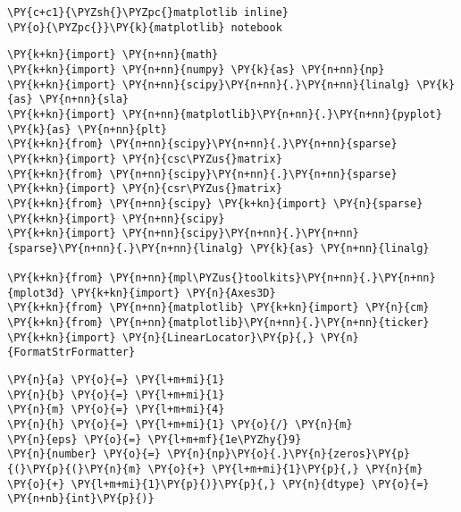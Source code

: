 
    \begin{tcolorbox}[breakable, size=fbox, boxrule=1pt, pad at break*=1mm,colback=cellbackground, colframe=cellborder]
\begin{Verbatim}[commandchars=\\\{\}]
\PY{c+c1}{\PYZsh{}\PYZpc{}matplotlib inline}
\PY{o}{\PYZpc{}}\PY{k}{matplotlib} notebook
\end{Verbatim}
\end{tcolorbox}

    \begin{tcolorbox}[breakable, size=fbox, boxrule=1pt, pad at break*=1mm,colback=cellbackground, colframe=cellborder]
\begin{Verbatim}[commandchars=\\\{\}]
\PY{k+kn}{import} \PY{n+nn}{math}
\PY{k+kn}{import} \PY{n+nn}{numpy} \PY{k}{as} \PY{n+nn}{np}
\PY{k+kn}{import} \PY{n+nn}{scipy}\PY{n+nn}{.}\PY{n+nn}{linalg} \PY{k}{as} \PY{n+nn}{sla}
\PY{k+kn}{import} \PY{n+nn}{matplotlib}\PY{n+nn}{.}\PY{n+nn}{pyplot} \PY{k}{as} \PY{n+nn}{plt}
\PY{k+kn}{from} \PY{n+nn}{scipy}\PY{n+nn}{.}\PY{n+nn}{sparse} \PY{k+kn}{import} \PY{n}{csc\PYZus{}matrix}
\PY{k+kn}{from} \PY{n+nn}{scipy}\PY{n+nn}{.}\PY{n+nn}{sparse} \PY{k+kn}{import} \PY{n}{csr\PYZus{}matrix}
\PY{k+kn}{from} \PY{n+nn}{scipy} \PY{k+kn}{import} \PY{n}{sparse}
\PY{k+kn}{import} \PY{n+nn}{scipy}
\PY{k+kn}{import} \PY{n+nn}{scipy}\PY{n+nn}{.}\PY{n+nn}{sparse}\PY{n+nn}{.}\PY{n+nn}{linalg} \PY{k}{as} \PY{n+nn}{linalg}

\PY{k+kn}{from} \PY{n+nn}{mpl\PYZus{}toolkits}\PY{n+nn}{.}\PY{n+nn}{mplot3d} \PY{k+kn}{import} \PY{n}{Axes3D}
\PY{k+kn}{from} \PY{n+nn}{matplotlib} \PY{k+kn}{import} \PY{n}{cm}
\PY{k+kn}{from} \PY{n+nn}{matplotlib}\PY{n+nn}{.}\PY{n+nn}{ticker} \PY{k+kn}{import} \PY{n}{LinearLocator}\PY{p}{,} \PY{n}{FormatStrFormatter}
\end{Verbatim}
\end{tcolorbox}

    \begin{tcolorbox}[breakable, size=fbox, boxrule=1pt, pad at break*=1mm,colback=cellbackground, colframe=cellborder]
\begin{Verbatim}[commandchars=\\\{\}]
\PY{n}{a} \PY{o}{=} \PY{l+m+mi}{1}
\PY{n}{b} \PY{o}{=} \PY{l+m+mi}{1}
\PY{n}{m} \PY{o}{=} \PY{l+m+mi}{4}
\PY{n}{h} \PY{o}{=} \PY{l+m+mi}{1} \PY{o}{/} \PY{n}{m}
\PY{n}{eps} \PY{o}{=} \PY{l+m+mf}{1e\PYZhy{}9}
\PY{n}{number} \PY{o}{=} \PY{n}{np}\PY{o}{.}\PY{n}{zeros}\PY{p}{(}\PY{p}{(}\PY{n}{m} \PY{o}{+} \PY{l+m+mi}{1}\PY{p}{,} \PY{n}{m} \PY{o}{+} \PY{l+m+mi}{1}\PY{p}{)}\PY{p}{,} \PY{n}{dtype} \PY{o}{=} \PY{n+nb}{int}\PY{p}{)}
\end{Verbatim}
\end{tcolorbox}

